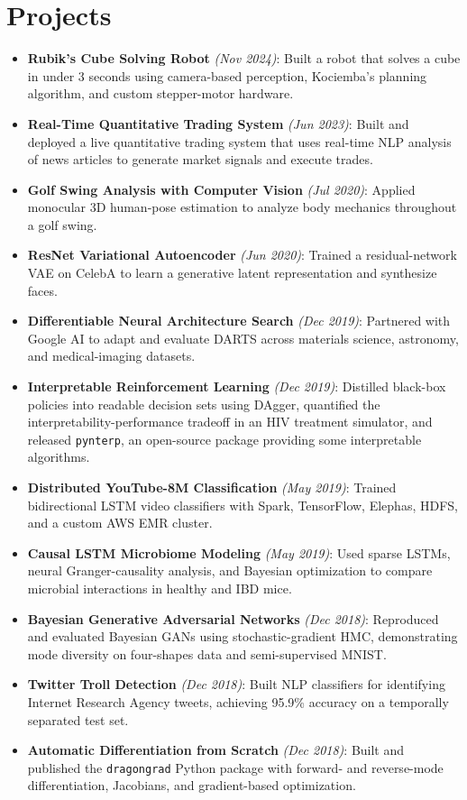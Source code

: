 \documentclass[a4paper,11pt]{article}
\newcommand{\resumeItem}[1]{
  \item\small{#1}
}
\newcommand{\resumeItemListStart}{
  \begin{itemize}[rightmargin=0.11in, itemsep=2pt, topsep=4pt, parsep=0pt, partopsep=0pt]
}
\newcommand{\resumeItemListEnd}{\end{itemize}}
\begin{document}
\section{Projects}
    \resumeItemListStart{}
        \resumeItem{
            \textbf{Rubik's Cube Solving Robot} \textit{(Nov 2024)}:
            Built a robot that solves a cube in under 3 seconds using camera-based perception, Kociemba's planning algorithm, and custom stepper-motor hardware.
        }
        \resumeItem{
            \textbf{Real-Time Quantitative Trading System} \textit{(Jun 2023)}:
            Built and deployed a live quantitative trading system that uses real-time NLP analysis of news articles to generate market signals and execute trades.
        }
        \resumeItem{
            \textbf{Golf Swing Analysis with Computer Vision} \textit{(Jul 2020)}:
            Applied monocular 3D human-pose estimation to analyze body mechanics throughout a golf swing.
        }
        \resumeItem{
            \textbf{ResNet Variational Autoencoder} \textit{(Jun 2020)}:
            Trained a residual-network VAE on CelebA to learn a generative latent representation and synthesize faces.
        }
        \resumeItem{
            \textbf{Differentiable Neural Architecture Search} \textit{(Dec 2019)}:
            Partnered with Google AI to adapt and evaluate DARTS across materials science, astronomy, and medical-imaging datasets.
        }
        \resumeItem{
            \textbf{Interpretable Reinforcement Learning} \textit{(Dec 2019)}:
            Distilled black-box policies into readable decision sets using DAgger, quantified the interpretability-performance tradeoff in an HIV treatment simulator, and released \texttt{pynterp}, an open-source package providing some interpretable algorithms.
        }
        \resumeItem{
            \textbf{Distributed YouTube-8M Classification} \textit{(May 2019)}:
            Trained bidirectional LSTM video classifiers with Spark, TensorFlow, Elephas, HDFS, and a custom AWS EMR cluster.
        }
        \resumeItem{
            \textbf{Causal LSTM Microbiome Modeling} \textit{(May 2019)}:
            Used sparse LSTMs, neural Granger-causality analysis, and Bayesian optimization to compare microbial interactions in healthy and IBD mice.
        }
        \resumeItem{
            \textbf{Bayesian Generative Adversarial Networks} \textit{(Dec 2018)}:
            Reproduced and evaluated Bayesian GANs using stochastic-gradient HMC, demonstrating mode diversity on four-shapes data and semi-supervised MNIST.
        }
        \resumeItem{
            \textbf{Twitter Troll Detection} \textit{(Dec 2018)}:
            Built NLP classifiers for identifying Internet Research Agency tweets, achieving 95.9\% accuracy on a temporally separated test set.
        }
        \resumeItem{
            \textbf{Automatic Differentiation from Scratch} \textit{(Dec 2018)}:
            Built and published the \texttt{dragongrad} Python package with forward- and reverse-mode differentiation, Jacobians, and gradient-based optimization.
        }
    \resumeItemListEnd{}
\end{document}
